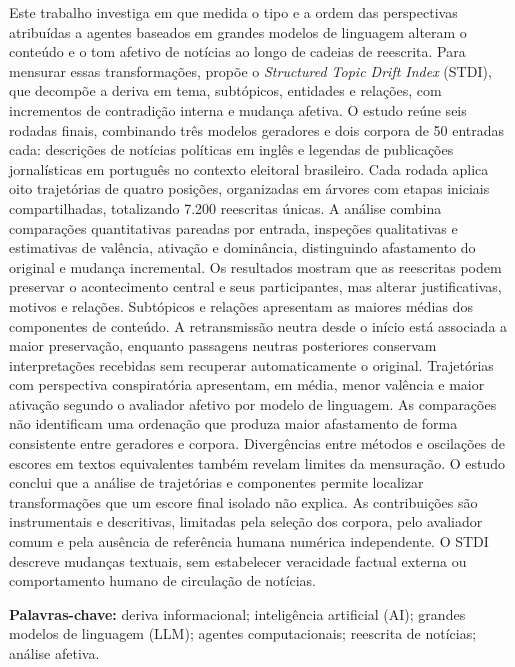 \begin{resumo}
\begin{SingleSpace}
Este trabalho investiga em que medida o tipo e a ordem das perspectivas atribuídas a agentes baseados em grandes modelos de linguagem alteram o conteúdo e o tom afetivo de notícias ao longo de cadeias de reescrita. Para mensurar essas transformações, propõe o \textit{Structured Topic Drift Index} (STDI), que decompõe a deriva em tema, subtópicos, entidades e relações, com incrementos de contradição interna e mudança afetiva. O estudo reúne seis rodadas finais, combinando três modelos geradores e dois corpora de 50 entradas cada: descrições de notícias políticas em inglês e legendas de publicações jornalísticas em português no contexto eleitoral brasileiro. Cada rodada aplica oito trajetórias de quatro posições, organizadas em árvores com etapas iniciais compartilhadas, totalizando 7.200 reescritas únicas. A análise combina comparações quantitativas pareadas por entrada, inspeções qualitativas e estimativas de valência, ativação e dominância, distinguindo afastamento do original e mudança incremental. Os resultados mostram que as reescritas podem preservar o acontecimento central e seus participantes, mas alterar justificativas, motivos e relações. Subtópicos e relações apresentam as maiores médias dos componentes de conteúdo. A retransmissão neutra desde o início está associada a maior preservação, enquanto passagens neutras posteriores conservam interpretações recebidas sem recuperar automaticamente o original. Trajetórias com perspectiva conspiratória apresentam, em média, menor valência e maior ativação segundo o avaliador afetivo por modelo de linguagem. As comparações não identificam uma ordenação que produza maior afastamento de forma consistente entre geradores e corpora. Divergências entre métodos e oscilações de escores em textos equivalentes também revelam limites da mensuração. O estudo conclui que a análise de trajetórias e componentes permite localizar transformações que um escore final isolado não explica. As contribuições são instrumentais e descritivas, limitadas pela seleção dos corpora, pelo avaliador comum e pela ausência de referência humana numérica independente. O STDI descreve mudanças textuais, sem estabelecer veracidade factual externa ou comportamento humano de circulação de notícias.
\end{SingleSpace}
\vspace{\onelineskip}
\textbf{Palavras-chave:} deriva informacional; inteligência artificial (AI); grandes modelos de linguagem (LLM); agentes computacionais; reescrita de notícias; análise afetiva.

\end{resumo}
